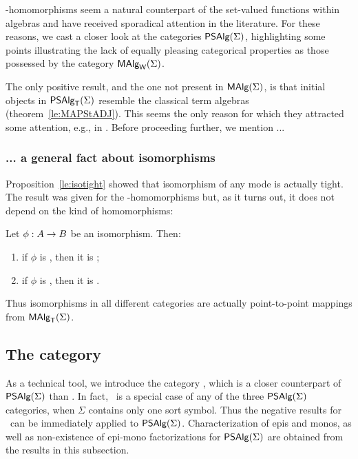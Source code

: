 \documentclass[10pt]{article}
\begin{document}
\PS-homomorphisms seem a natural counterpart of the set-valued functions within
algebras and have received sporadical attention in the literature. 
For these reasons, we cast a closer look at 
the categories $\mbox{\sf PSAlg}(\Sigma)$, highlighting some points
illustrating the lack of equally pleasing categorical properties as
those possessed by the category $\mbox{\rm\sf MAlg}_{\sf W}(\Sigma)$.  

The only positive result, and
the one not present in $\mbox{\rm\sf MAlg}(\Sigma)$, is that initial objects
in $\mbox{\sf PSAlg}_{\sf T}(\Sigma)$ resemble the classical term algebras
(theorem~\ref{le:MAPStADJ}). This seems the only reason for which they 
attracted some attention, e.g., in \cite{c:57,c:58}.
 Before proceeding further, we mention ...
%
\subsubsection*{... a general fact about isomorphisms}
Proposition~\ref{le:isotight} showed that isomorphism of any mode
is actually tight. The result was given for the 
\PP-homomorphisms but, as it turns out, it does not depend on the kind
of homomorphisms:

\begin{Prop}
\label{le:isopp}
Let $\phi:A\rightarrow B$ be an isomorphism. Then: 
\begin{enumerate}\MyLPar
\item if $\phi$ is \SSs, then it is \PS;
\item if $\phi$ is \PS, then it is \PP.
\end{enumerate}
\end{Prop}

\noindent
Thus isomorphisms in all different categories 
are actually point-to-point mappings from $\mbox{\rm\sf MAlg}_{\sf T}(\Sigma)$.




\subsection{The category \PSt }

As a technical tool, we introduce the category
\PSt, which is a closer counterpart of $\mbox{\sf PSAlg}(\Sigma)$ than \Set. In fact,
\PSt\ is a special case of any of the three $\mbox{\sf PSAlg}(\Sigma)$ categories, when
$\Sigma$ contains only one sort symbol. Thus the negative results for
\PSt\ can be immediately applied to $\mbox{\sf PSAlg}(\Sigma)$.  Characterization of epis
and monos, as well as non-existence of epi-mono factorizations for
$\mbox{\sf PSAlg}(\Sigma)$ are obtained from the results in this subsection.
\end{document}
